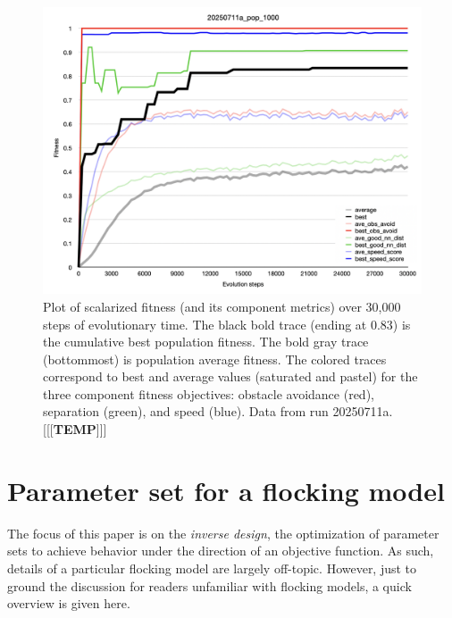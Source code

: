 \documentclass[letterpaper]{article}
\begin{document}


\begin{figure}[t]
    \centering
    \includegraphics[width=\linewidth]{images/temp_fit_plot.png}
    \caption{Plot of scalarized fitness (and its component metrics) over 30,000 steps of evolutionary time. The black bold trace (ending at 0.83) is the cumulative best population fitness. The bold gray trace (bottommost) is population average fitness. The colored traces correspond to best and average values (saturated and pastel) for the three component fitness objectives: obstacle avoidance (red), separation (green), and speed (blue). Data from run 20250711a. [[[\textbf{TEMP}]]]}
    \label{fig:fit_plot}
\end{figure}

\section{Parameter set for a flocking model}
\label{sec:parameter_set}

The focus of this paper is on the \textit{inverse design}, the optimization of parameter sets to achieve behavior under the direction of an objective function. As such, details of a particular flocking model are largely off-topic. However, just to ground the discussion for readers unfamiliar with flocking models, a quick overview is given here.
\end{document}
